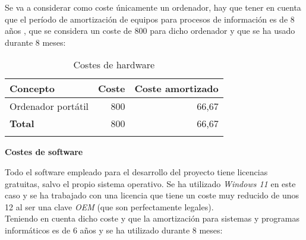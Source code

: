 Se va a considerar como coste únicamente un ordenador, hay que tener en cuenta que el período de amortización de equipos para procesos de información es de 8 años \cite{agencia_tributaria_tabla_2022}, que se considera un coste de 800 \officialeuro \thinspace para dicho ordenador y que se ha usado durante 8 meses:

\begin{longtable}[]{@{}lrr@{}}
	\toprule
	\begin{minipage}[b]{0.29\columnwidth}\raggedright\strut
		\textbf{Concepto}\strut
	\end{minipage} & \begin{minipage}[b]{0.18\columnwidth}\raggedright\strut
		\textbf{Coste}\strut
	\end{minipage} & \begin{minipage}[b]{0.32\columnwidth}\raggedright\strut
		\textbf{Coste amortizado}\strut
	\end{minipage}\tabularnewline
	\midrule
	\endhead
	\begin{minipage}[t]{0.29\columnwidth}\raggedright\strut
		Ordenador portátil\strut
	\end{minipage} & \begin{minipage}[t]{0.18\columnwidth}\raggedright\strut
		800 \officialeuro\strut
	\end{minipage} & \begin{minipage}[t]{0.32\columnwidth}\raggedright\strut
		66,67 \officialeuro\strut
	\end{minipage}\tabularnewline
	\midrule
	\begin{minipage}[t]{0.29\columnwidth}\raggedright\strut
		\textbf{Total}\strut
	\end{minipage} & \begin{minipage}[t]{0.18\columnwidth}\raggedright\strut
		800 \officialeuro\strut
	\end{minipage} & \begin{minipage}[t]{0.32\columnwidth}\raggedright\strut
		66,67 \officialeuro\strut
	\end{minipage}\tabularnewline
	\bottomrule
	\caption{Costes de hardware}
\end{longtable}

\textbf{Costes de software}

Todo el software empleado para el desarrollo del proyecto tiene licencias gratuitas, salvo el propio sistema operativo. Se ha utilizado \textit{Windows 11} en este caso y se ha trabajado con una licencia que tiene un coste muy reducido de unos 12 \officialeuro al ser una clave \textit{OEM} (que son perfectamente legales).\\
Teniendo en cuenta dicho coste y que la amortización para sistemas y programas informáticos es de 6 años \cite{agencia_tributaria_tabla_2022} y se ha utilizado durante 8 meses:

